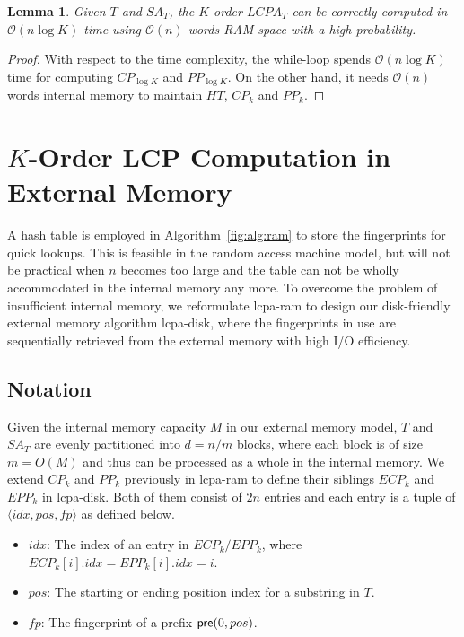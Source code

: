 \documentclass[10pt,journal,letterpaper,compsoc]{IEEEtran}
\newtheorem{Lemma}{Lemma}
\begin{document}
\begin{CJK*}{GBK}{song}
\begin{Lemma}
\label{thm:lcp:ram}
Given $T$ and $SA_T$, the $K$-order $LCPA_T$ can be correctly computed in $\mathcal{O}(n\log K)$ time using $\mathcal{O}(n)$ words RAM space with a high probability.
\end{Lemma}

\begin{proof}
With respect to the time complexity, the while-loop spends $\mathcal{O}(n\log K)$ time for computing $CP_{\log K}$ and $PP_{\log K}$. On the other hand, it needs $\mathcal{O}(n)$ words internal memory to maintain $HT$, $CP_k$ and $PP_k$.
\end{proof}

\section{$K$-Order LCP Computation in External Memory}\label{sec:construction_in_em}

A hash table is employed in Algorithm~\ref{fig:alg:ram} to store the fingerprints for quick lookups. This is feasible in the random access machine model, but will not be practical when $n$ becomes too large and the table can not be wholly accommodated in the internal memory any more. To overcome the problem of insufficient internal memory, we reformulate lcpa-ram to design our disk-friendly external memory algorithm lcpa-disk, where the fingerprints in use are sequentially retrieved from the external memory with high I/O efficiency.

\subsection{Notation}

Given the internal memory capacity $M$ in our external memory model, $T$ and $SA_T$ are evenly partitioned into $d=n/m$ blocks, where each block is of size $m=O(M)$ and thus can be processed as a whole in the internal memory. We extend $CP_k$ and $PP_k$ previously in lcpa-ram to define their siblings $ECP_k$ and $EPP_k$ in lcpa-disk. Both of them consist of $2n$ entries and each entry is a tuple of $\langle idx, pos, fp \rangle$ as defined below.
\begin{itemize}
\item $idx$: The index of an entry in $ECP_k/EPP_k$, where $ECP_k[i].idx=EPP_k[i].idx=i$.
\item $pos$: The starting or ending position index for a substring in $T$.
\item $fp$: The fingerprint of a prefix ${\sf pre}(0,pos)$.
\end{itemize}


\end{CJK*}
\end{document}
